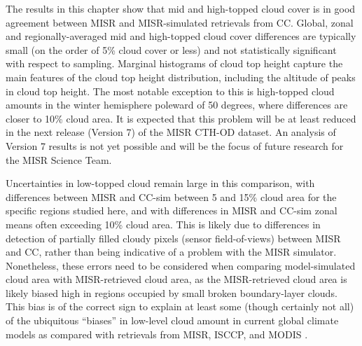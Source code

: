 The results in this chapter show that mid and high-topped cloud cover is
in good agreement between MISR and MISR-simulated retrievals from CC.
Global, zonal and regionally-averaged mid and high-topped cloud cover
differences are typically small (on the order of 5\% cloud cover or
less) and not statistically significant with respect to sampling.
Marginal histograms of cloud top height capture the main features of the
cloud top height distribution, including the altitude of peaks in cloud
top height. The most notable exception to this is high-topped cloud
amounts in the winter hemisphere poleward of 50 degrees, where
differences are closer to 10\% cloud area. It is expected that this
problem will be at least reduced in the next release (Version 7) of the
MISR CTH-OD dataset. An analysis of Version 7 results is not yet
possible and will be the focus of future research for the MISR Science
Team.

Uncertainties in low-topped cloud remain large in this comparison, with
differences between MISR and CC-sim between 5 and 15\% cloud area for
the specific regions studied here, and with differences in MISR and
CC-sim zonal means often exceeding 10\% cloud area. This is likely due
to differences in detection of partially filled cloudy pixels (sensor
field-of-views) between MISR and CC, rather than being indicative of a
problem with the MISR simulator. Nonetheless, these errors need to be
considered when comparing model-simulated cloud area with MISR-retrieved
cloud area, as the MISR-retrieved cloud area is likely biased high in
regions occupied by small broken boundary-layer clouds. This bias is of
the correct sign to explain at least some (though certainly not all) of
the ubiquitous ``biases'' in low-level cloud amount in current global
climate models as compared with retrievals from MISR, ISCCP, and MODIS
\citep[e.g.,][]{zhang_et_al_2005, pincus_et_al_2012, kay_et_al_2012, klein_et_al_2013}.

